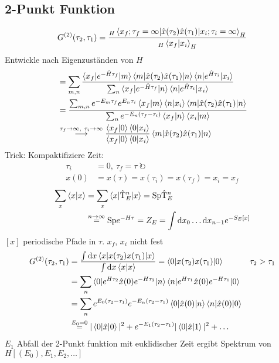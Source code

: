 \subsection{2-Punkt Funktion}
	\begin{align*}
		G^{(2)} (\tau_2, \tau_1) &=
		\frac{{}_H\braket{x_f; \tau_f = \infty | \hat{x} (\tau_2) \hat{x}(\tau_1) | x_i; \tau_i = \infty}_H}{{}_H\braket{x_f | x_i}_H} \\
	\end{align*}
	Entwickle nach Eigenzuständen von $H$
	\begin{align*}
		&= \sum_{m, n} \frac{\braket{x_f | e^{-\hat{H} \tau_f} | m} 
		\braket{m | \hat{x} (\tau_2) \hat{x} (\tau_1)| n} \braket{n | e^{\hat{H} \tau_i} | x_i}}{\sum_n \braket{x_f | e^{-\hat{H}\tau_f} | n} \braket{n | e^{\hat{H} \tau_i} | x_i}} \\
		&= \frac{\sum_{m,n} e^{-E_m\tau_f}e^{E_n\tau_i} \braket{x_f | m} \braket{n|x_i} \braket{m | \hat{x} (\tau_2) \hat{x} (\tau_1) | n}}{\sum_n e^{-E_n(\tau_f -\tau_i)} \braket{x_f | n} \braket{x_i | m}}\\
		&\overset{\tau_f \rightarrow \infty,~\tau_i \rightarrow \infty}{\longrightarrow}
		\frac{\braket{x_f | 0} \braket{0 | x_i}}{\braket{x_f | 0} \braket{0 | x_i}} \braket{m | \hat{x} (\tau_2) \hat{x} (\tau_1) | n}
	\end{align*}
Trick: Kompaktifiziere Zeit:
	\begin{align*}
		\tau_i &= 0,~ \tau_f = \tau~ \circlearrowright \\
		x(0) &= x(\tau) = x(\tau_i) = x(\tau_f) = x_i = x_f
	\end{align*}
	\begin{align*}
		\sum_x \braket{x | x} &= 
		\sum_x \braket{x | \hat{\mathrm{T}}_E^n | x} = \mathrm{Sp} \hat{\mathrm{T}}_E^n \\
		&\overset{n \rightarrow \infty}{=} \mathrm{Sp} e^{-H\tau} = Z_E = 
		\int \mathrm{d} x_0 \ldots \mathrm{d} x_{n-1} e^{-S_E[x]}
	\end{align*}
$[x]$ periodische Pfade in $\tau$.  $x_f$, $x_i$ nicht fest
	\begin{align*}
		G^{(2)}(\tau_2, \tau_1) &=
		\frac{\int \mathrm{d} x \braket{x | x(\tau_2) x(\tau_1) | x}}{\int \mathrm{d} x\braket{x | x}} 
		= \braket{0 | x(\tau_2) x(\tau_1) | 0} 
		& \tau_2 &> \tau_1 \\
		&= \sum_n \braket{0 | e^{H \tau_2} \hat{x} (0) e^{-H \tau_2} | n}
		\braket{n | e^{H \tau_1} \hat{x} (0) e^{-H \tau_1} | 0} \\
		&= \sum_n e^{E_0(\tau_2 - \tau_1)} e^{-E_n(\tau_2 - \tau_1)}
		\braket{0 | \hat{x} (0) | n} \braket{n | \hat{x} (0) | 0} \\
		&\overset{E_0 = 0}{=} |\braket{0 | \hat{x} | 0 }|^2 + e^{-E_1(\tau_2 - \tau_1)} 
		|\braket{0 | \hat{x} | 1}|^2 + \ldots
	\end{align*}
$E_1$ Abfall der 2-Punkt funktion mit euklidischer Zeit ergibt Spektrum von $H [(E_0), E_1 ,E_2, \ldots]$


